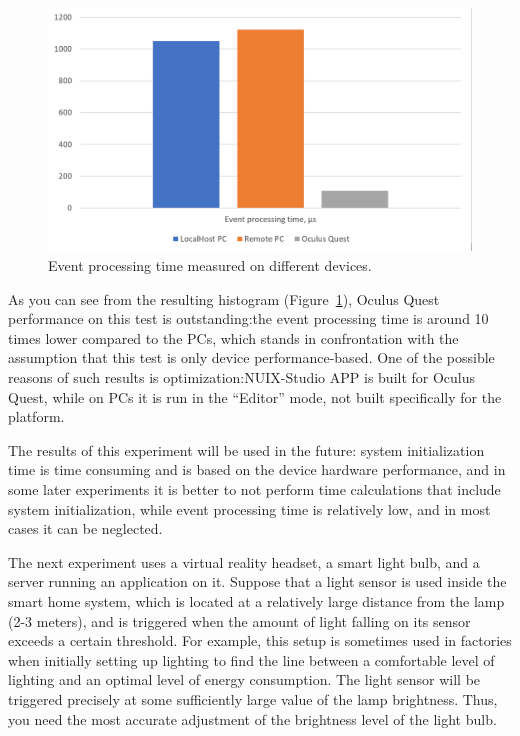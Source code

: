 \begin{figure}
  \centering
  \includegraphics[width = 0.9 \linewidth]{figures/EventProcessingTime.png}
  \caption{Event processing time measured on different devices.}
  \label{fig:EventProcessingTime-figure}
\end{figure}

As you can see from the resulting histogram (Figure~\ref{fig:EventProcessingTime-figure}), Oculus Quest performance on this test is outstanding:the event processing time is around 10 times lower compared to the PCs, which stands in confrontation with the assumption that this test is only device performance-based. One of the possible reasons of such results is optimization:NUIX-Studio APP is built for Oculus Quest, while on PCs it is run in the “Editor” mode, not built specifically for the platform.


The results of this experiment will be used in the future: system initialization time is time consuming and is based on the device hardware performance, and in some later experiments it is better to not perform time calculations that include system initialization, while event processing time is relatively low, and in most cases it can be neglected.

The next experiment uses a virtual reality headset, a smart light bulb, and a server running an application on it. Suppose that a light sensor is used inside the smart home system, which is located at a relatively large distance from the lamp (2-3 meters), and is triggered when the amount of light falling on its sensor exceeds a certain threshold. For example, this setup is sometimes used in factories when initially setting up lighting to find the line between a comfortable level of lighting and an optimal level of energy consumption. The light sensor will be triggered precisely at some sufficiently large value of the lamp brightness. Thus, you need the most accurate adjustment of the brightness level of the light bulb.

